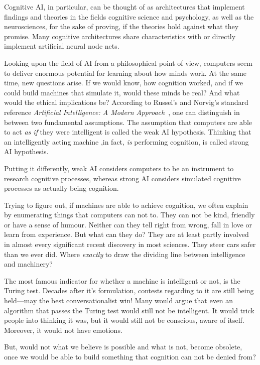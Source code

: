 Cognitive AI, in particular, can be thought of as architectures that implement findings and theories in the fields cognitive science and psychology, as well as the neurosciences, for the sake of proving, if the theories hold against what they promise. Many cognitive architectures share characteristics with or directly implement artificial neural node nets.

Looking upon the field of AI from a philosophical point of view, computers seem to deliver enormous potential for learning about how minds work. At the same time, new questions arise. If we would know, how cognition worked, and if we could build machines that simulate it, would these minds be real? And what would the ethical implications be? According to Russel's and Norvig's standard reference \emph{Artificial Intelligence: A Modern Approach}~\cite{russell2009artificial}, one can distinguish in between two fundamental assumptions. The assumption that computers are able to act \emph{as if} they were intelligent is called the weak AI hypothesis. Thinking that an intelligently acting machine ,in fact, \emph{is} performing cognition, is called strong AI hypothesis.

Putting it differently, weak AI considers computers to be an instrument to research cognitive processes, whereas strong AI considers simulated cognitive processes as actually being cognition.

Trying to figure out, if machines are able to achieve cognition, we often explain by enumerating things that computers can not to. They can not be kind, friendly or have a sense of humour. Neither can they tell right from wrong, fall in love or learn from experience. But what can they do? They are at least partly involved in almost every significant recent discovery in most sciences. They steer cars safer than we ever did. Where \emph{exactly} to draw the dividing line between intelligence and machinery?~\cite{russell2009artificial}

The most famous indicator for whether a machine is intelligent or not, is the Turing test. Decades after it's formulation, contests regarding to it are still being held---may the best conversationalist win! Many would argue that even an algorithm that passes the Turing test would still not be intelligent. It would trick people into thinking it was, but it would still not be conscious, aware of itself. Moreover, it would not have emotions.~\cite{russell2009artificial}

But, would not what we believe is possible and what is not, become obsolete, once we would be able to build something that cognition can not be denied from? 

